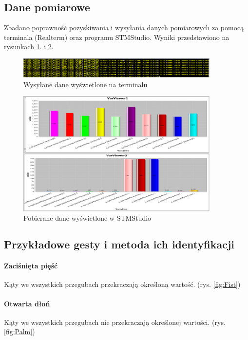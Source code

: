 \documentclass[12pt,a4paper]{article}
\begin{document}
\subsection{Dane pomiarowe}
Zbadano poprawność pozyskiwania i wysyłania danych pomiarowych za pomocą terminala (Realterm) oraz programu STMStudio. Wyniki przedstawiono na rysunkach \ref{fig:term}. i \ref{fig:stmstudio}.

\begin{figure}
\centering
\includegraphics[width=0.9\textwidth]{./images/terminal.png}
\caption{Wysyłane dane wyświetlone na terminalu}
\label{fig:term}
\end{figure}

\begin{figure}
\centering
\includegraphics[width=0.9\textwidth]{./images/stmstudio.png}
\caption{Pobierane dane wyświetlone w STMStudio}
\label{fig:stmstudio}
\end{figure}

\subsection{Przykładowe gesty i metoda ich identyfikacji}
\paragraph{Zaciśnięta pięść}
Kąty we wszystkich przegubach przekraczają określoną wartość. (rys. \ref{fig:Fist})
\paragraph{Otwarta dłoń}
Kąty we wszystkich przegubach nie przekraczają określonej wartości. (rys. \ref{fig:Palm})
\end{document}

